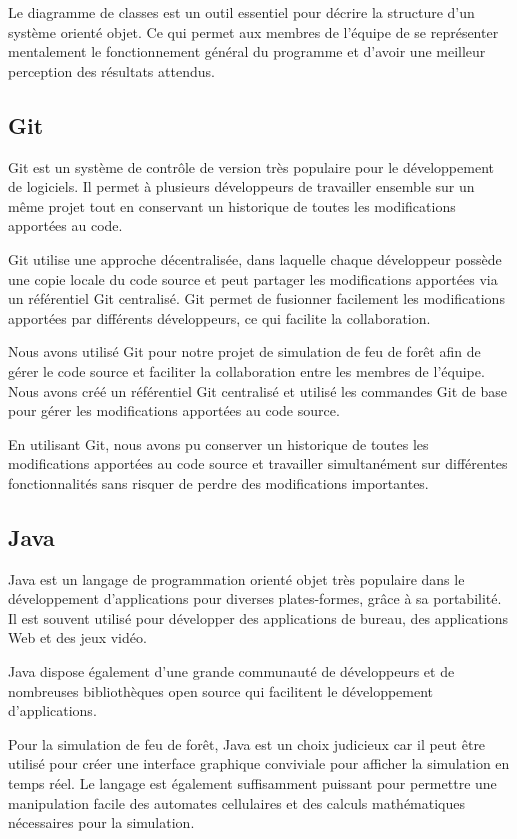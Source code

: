 Le diagramme de classes est un outil essentiel pour décrire la structure d'un système orienté objet. Ce qui permet aux membres de l'équipe de se représenter mentalement le fonctionnement général du programme et d'avoir une meilleur perception des résultats attendus. 


\subsection{Git}

Git est un système de contrôle de version très populaire pour le développement de logiciels. Il permet à plusieurs développeurs de travailler ensemble sur un même projet tout en conservant un historique de toutes les modifications apportées au code.

Git utilise une approche décentralisée, dans laquelle chaque développeur possède une copie locale du code source et peut partager les modifications apportées via un référentiel Git centralisé. Git permet de fusionner facilement les modifications apportées par différents développeurs, ce qui facilite la collaboration. 

Nous avons utilisé Git pour notre projet de simulation de feu de forêt afin de gérer le code source et faciliter la collaboration entre les membres de l'équipe. Nous avons créé un référentiel Git centralisé et utilisé les commandes Git de base pour gérer les modifications apportées au code source. 

En utilisant Git, nous avons pu conserver un historique de toutes les modifications apportées au code source et travailler simultanément sur différentes fonctionnalités sans risquer de perdre des modifications importantes.

\subsection{Java}

Java est un langage de programmation orienté objet très populaire dans le développement d'applications pour diverses plates-formes, grâce à sa portabilité. Il est souvent utilisé pour développer des applications de bureau, des applications Web et des jeux vidéo. 

Java dispose également d'une grande communauté de développeurs et de nombreuses bibliothèques open source qui facilitent le développement d'applications.

Pour la simulation de feu de forêt, Java est un choix judicieux car il peut être utilisé pour créer une interface graphique conviviale pour afficher la simulation en temps réel. Le langage est également suffisamment puissant pour permettre une manipulation facile des automates cellulaires et des calculs mathématiques nécessaires pour la simulation.